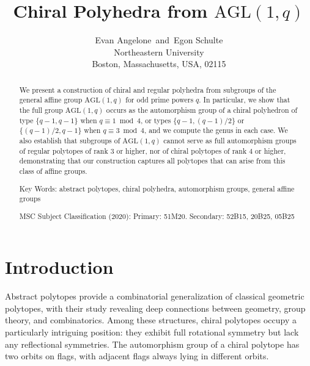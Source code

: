 \documentclass[12pt]{article}
\theoremstyle{definition}\newtheorem{definition}{Definition}[section]
\begin{document}

\title{Chiral Polyhedra from $\mathrm{AGL}(1,q)$} %
 
\author{Evan Angelone\ and\ Egon Schulte\\
Northeastern University\\
Boston, Massachusetts, USA, 02115}

\maketitle 


\begin{abstract}
We present a construction of chiral and regular polyhedra from subgroups of the general affine group $\mathrm{AGL}(1,q)$ for odd prime powers $q$. In particular, we show that the full group $\mathrm{AGL}(1,q)$ occurs as the automorphism group of a chiral polyhedron of type $\{q-1, q-1\}$ when $q \equiv 1 \bmod{4}$, or types $\{q-1,(q-1)/2\}$ or $\{(q-1)/2, q-1\}$ when $q \equiv 3 \bmod{4}$, and we compute the genus in each case. We also establish that subgroups of $\mathrm{AGL}(1,q)$ cannot serve as full automorphism groups of regular polytopes of rank $3$ or higher, nor of chiral polytopes of rank $4$ or higher, demonstrating that our construction captures all polytopes that can arise from this class of affine groups.
\bigskip\medskip

\noindent
Key Words: abstract polytopes, chiral polyhedra, automorphism groups, general affine groups
\medskip

\noindent
MSC Subject Classification (2020): Primary: 51M20. Secondary: 52B15, 20B25, 05B25 
\end{abstract}

\section{Introduction}
\label{intro}

Abstract polytopes provide a combinatorial generalization of classical geometric polytopes, with their study revealing deep connections between geometry, group theory, and combinatorics. Among these structures, chiral polytopes occupy a particularly intriguing position: they exhibit full rotational symmetry but lack any reflectional symmetries. The automorphism group of a chiral polytope has two orbits on flags, with adjacent flags always lying in different orbits.
\end{document}
